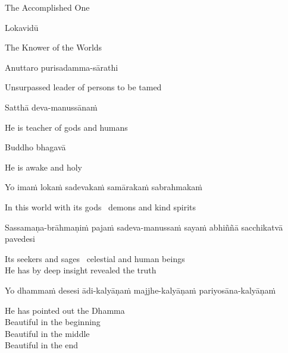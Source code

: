 \begin{english}
  The Accomplished One
\end{english}

Lokavidū

\begin{english}
  The Knower of the Worlds
\end{english}

Anuttaro purisadamma-sārathi

\begin{english}
  Unsurpassed leader of persons to be tamed\makeatletter\hyperlink{endnote3-appendix}\makeatother
\end{english}

Satthā deva-manussānaṁ

\begin{english}
  He is teacher of gods and humans
\end{english}

Buddho bhagavā

\begin{english}
  He is awake and holy
\end{english}

Yo imaṁ lokaṁ sadevakaṁ samārakaṁ sabrahmakaṁ

\begin{english}
  In this world with its gods \breathmark\ demons and kind spirits
\end{english}

\begin{pali-hang}
  Sassamaṇa-brāhmaṇiṁ pajaṁ sadeva-manussaṁ sayaṁ abhiññā sacchikatvā pavedesi
\end{pali-hang}

\begin{english}
  Its seekers and sages \breathmark\ celestial and human beings\\
  He has by deep insight revealed the truth
\end{english}

\begin{pali-hang}
  Yo dhammaṁ desesi ādi-kalyāṇaṁ majjhe-kalyāṇaṁ pariyosāna-kalyāṇaṁ
\end{pali-hang}

\begin{english-verses}
  He has pointed out the Dhamma\\
  Beautiful in the beginning\\
  Beautiful in the middle\\
  Beautiful in the end\\
\end{english-verses}

